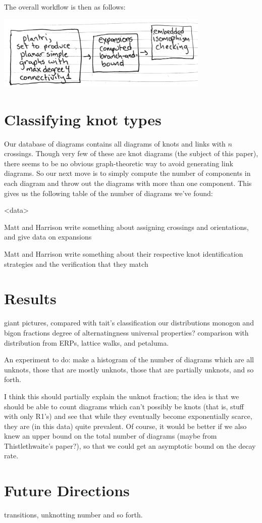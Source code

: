 \documentclass[amsmath,secnumarabic,floatfix,amssymb,nofootinbib,nobibnotes,letterpaper,11pt,tightenlines,showkeys]{revtex4}
\theoremstyle{definition}
\begin{document}
The overall workflow is then as follows:
\begin{center}
\includegraphics[width=4in]{workflow}
\end{center}

\section{Classifying knot types}

Our database of diagrams contains all diagrams of knots and links with $n$ crossings. Though very few of these are knot diagrams (the subject of this paper), there seems to be no obvious graph-theoretic way to avoid generating link diagrams. So our next move is to simply compute the number of components in each diagram and throw out the diagrams with more than one component. This gives us the following table of the number of diagrams we've found:

<data>

\begin{center}
Matt and Harrison write something about assigning crossings and orientations, and give data on expansions
\end{center}

\begin{center}
Matt and Harrison write something about their respective knot identification strategies and the verification that they match
\end{center}

\section{Results}

giant pictures, compared with tait's classification
our distributions
monogon and bigon fractions
degree of alternatingness
universal properties? comparison with distribution from ERPs, lattice walks, and petaluma.

An experiment to do: make a histogram of the number of diagrams which are all unknots, those that are mostly unknots, those that are partially unknots, and so forth.

I think this should partially explain the unknot fraction; the idea is that we should be able to count diagrams which can't possibly be knots (that is, stuff with only R1's) and see that while they eventually become exponentially scarce, they are (in this data) quite prevalent. Of course, it would be better if we also knew an upper bound on the total number of diagrams (maybe from Thistlethwaite's paper?), so that we could get an asymptotic bound on the decay rate.


\section{Future Directions}

transitions, unknotting number and so forth.


\end{document}
